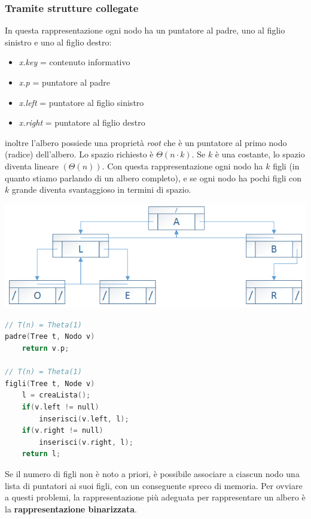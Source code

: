 \documentclass[italian]{article}
\begin{document}
\subsubsection{Tramite strutture collegate}
In questa rappresentazione ogni nodo ha un puntatore al padre, uno al figlio sinistro e uno al figlio destro:
\begin{itemize}[itemsep=0pt]
	\item \textit{x.key} = contenuto informativo
	\item \textit{x.p} = puntatore al padre
	\item \textit{x.left} = puntatore al figlio sinistro 
	\item \textit{x.right} = puntatore al figlio destro
\end{itemize}
inoltre l'albero possiede una proprietà \textit{root} che è un puntatore al primo nodo (radice) dell'albero. Lo spazio richiesto è $\varTheta(n\cdot k)$. Se $k$ è una costante, lo spazio diventa lineare $(\varTheta(n))$. Con questa rappresentazione ogni nodo ha $k$ figli (in quanto stiamo parlando di un albero completo), e se ogni nodo ha pochi figli con $k$ grande diventa svantaggioso in termini di spazio.  
\begin{center}
\includegraphics[width=0.7\linewidth]{images/albero_left_right_children}
\end{center}
\begin{lstlisting}[language=c,mathescape=true]
// T(n) = Theta(1)
padre(Tree t, Nodo v)
	return v.p;

// T(n) = Theta(1)
figli(Tree t, Node v)
	l = creaLista();
	if(v.left != null)
		inserisci(v.left, l);
	if(v.right != null)
		inserisci(v.right, l);
	return l;
\end{lstlisting}
Se il numero di figli non è noto a priori, è possibile associare a ciascun nodo una lista di puntatori ai suoi figli, con un conseguente spreco di memoria. Per ovviare a questi problemi, la rappresentazione più adeguata per rappresentare un albero è la \textbf{rappresentazione binarizzata}.
\pagebreak
\end{document}
